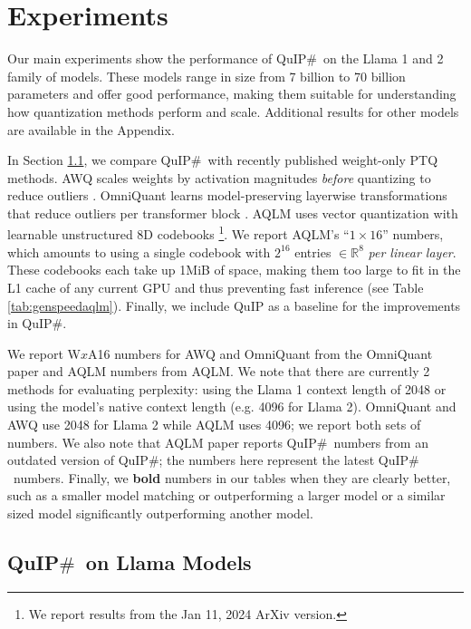 \section{Experiments}

Our main experiments show the performance of QuIP$\#$\  on the Llama 1 \cite{llama1} and 2 \cite{llama2} family of models. These models range in size from 7 billion to 70 billion parameters and offer good performance, making them suitable for understanding how quantization methods perform and scale. Additional results for other models are available in the Appendix.

In Section \ref{sec:qss_llama}, we compare QuIP$\#$\  with recently published weight-only PTQ methods. AWQ scales weights by activation magnitudes \textit{before} quantizing to reduce outliers \cite{awq}. OmniQuant learns model-preserving layerwise transformations that reduce outliers per transformer block \cite{omniquant}. AQLM uses vector quantization with learnable unstructured 8D codebooks \cite{aqlm}\footnote{We report results from the Jan 11, 2024 ArXiv version.}. We report AQLM's ``$1 \times 16$'' numbers, which amounts to using a single codebook with $2^{16}$ entries $\in \mathbb{R}^8$ \textit{per linear layer}. These codebooks each take up 1MiB of space, making them too large to fit in the L1 cache of any current GPU and thus preventing fast inference (see Table \ref{tab:genspeedaqlm}).
Finally, we include QuIP \cite{chee2023quip} as a baseline for the improvements in QuIP$\#$.

We report W$x$A16 numbers for AWQ and OmniQuant from the OmniQuant paper and AQLM numbers from AQLM. We note that there are currently 2 methods for evaluating perplexity: using the Llama 1 context length of 2048 or using the model's native context length (e.g. 4096 for Llama 2). OmniQuant and AWQ use 2048 for Llama 2 while AQLM uses 4096; we report both sets of numbers. We also note that AQLM paper reports QuIP$\#$\  numbers from an outdated version of QuIP$\#$; the numbers here represent the latest QuIP$\#$\  numbers. Finally, we \textbf{bold} numbers in our tables when they are clearly better, such as a smaller model matching or outperforming a larger model or a similar sized model significantly outperforming another model.

\subsection{QuIP$\#$\  on Llama Models}
\label{sec:qss_llama}

